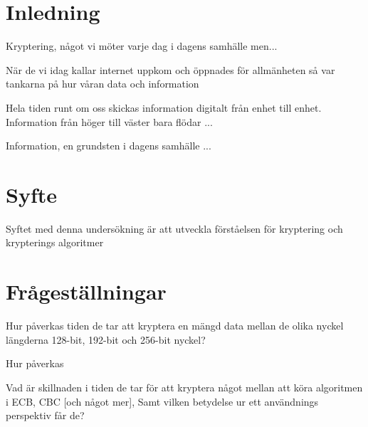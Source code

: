 
\section{Inledning}
Kryptering, något vi möter varje dag i dagens samhälle men...

När de vi idag kallar internet uppkom och öppnades för allmänheten så var tankarna på hur
våran data och information

Hela tiden runt om oss skickas information digitalt från enhet till enhet. Information från
höger till väster bara flödar ...

Information, en grundsten i dagens samhälle ...

\section{Syfte}
Syftet med denna undersökning är att utveckla förståelsen för kryptering och krypterings
algoritmer


\section{Frågeställningar}
Hur påverkas tiden de tar att kryptera en mängd data mellan de olika nyckel längderna 128-bit,
192-bit och 256-bit nyckel?

Hur påverkas 

Vad är skillnaden i tiden de tar för att kryptera något mellan att köra algoritmen i ECB, CBC
[och något mer], Samt vilken betydelse ur ett användnings perspektiv får de?
